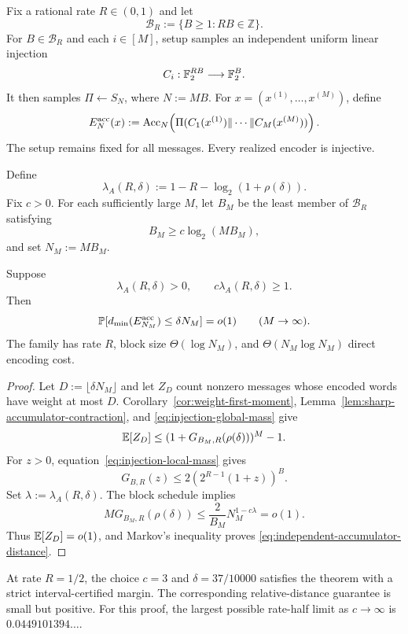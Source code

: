 Fix a rational
rate $R\in(0,1)$ and let
\[
  \mathcal B_R:=\{B\ge1:RB\in\mathbb Z\}.
\]
For $B\in\mathcal B_R$ and each $i\in[M]$, setup samples an independent
uniform linear injection
\[
  C_i:\mathbb F_2^{RB}\longrightarrow\mathbb F_2^B.
\]
It then samples $\Pi\gets S_N$, where $N:=MB$. For
$x=(x^{(1)},\ldots,x^{(M)})$, define
\begin{equation}
  E_N^{\mathrm{acc}}(x)
  :=
  \operatorname{Acc}_N\!\left(
    \Pi(C_1(x^{(1)})\Vert\cdots\Vert C_M(x^{(M)}))
  \right).
  \label{eq:independent-accumulator-spin}
\end{equation}
The setup remains fixed for all messages. Every realized encoder is
injective.

Define
\begin{equation}
  \lambda_A(R,\delta)
  :=
  1-R-\log_2(1+\rho(\delta)).
  \label{eq:accumulator-sparse-exponent}
\end{equation}
Fix $c>0$. For each sufficiently large $M$, let $B_M$ be the least member of
$\mathcal B_R$ satisfying
\[
  B_M\ge c\log_2(MB_M),
\]
and set $N_M:=MB_M$.

\begin{theorem}
\label{thm:independent-accumulator-spin}
Suppose
\[
  \lambda_A(R,\delta)>0,
  \qquad
  c\lambda_A(R,\delta)\ge1.
\]
Then
\begin{equation}
  \mathbb P[d_{\min}(E_{N_M}^{\mathrm{acc}})\le\delta N_M]
  =o(1)
  \qquad(M\to\infty).
  \label{eq:independent-accumulator-distance}
\end{equation}
The family has rate $R$, block size $\Theta(\log N_M)$, and
$\Theta(N_M\log N_M)$ direct encoding cost.
\end{theorem}

\begin{proof}
Let $D:=\lfloor\delta N_M\rfloor$ and let $Z_D$ count nonzero messages whose
encoded words have weight at most $D$. Corollary~\ref{cor:weight-first-moment},
Lemma~\ref{lem:sharp-accumulator-contraction}, and
\eqref{eq:injection-global-mass} give
\[
  \mathbb E[Z_D]
  \le
  (1+G_{B_M,R}(\rho(\delta)))^M-1.
\]
For $z>0$, equation~\eqref{eq:injection-local-mass} gives
\[
  G_{B,R}(z)
  \le
  2\left(2^{R-1}(1+z)\right)^B.
\]
Set $\lambda:=\lambda_A(R,\delta)$. The block schedule implies
\[
  M G_{B_M,R}(\rho(\delta))
  \le
  \frac{2}{B_M}N_M^{1-c\lambda}
  =o(1).
\]
Thus $\mathbb E[Z_D]=o(1)$, and Markov's inequality proves
\eqref{eq:independent-accumulator-distance}.
\end{proof}

At rate $R=1/2$, the choice $c=3$ and
$\delta=37/10000$ satisfies the theorem with a strict interval-certified
margin. The corresponding relative-distance guarantee is small but positive.
For this proof, the largest possible rate-half limit as $c\to\infty$ is
$0.0449101394\ldots$.
